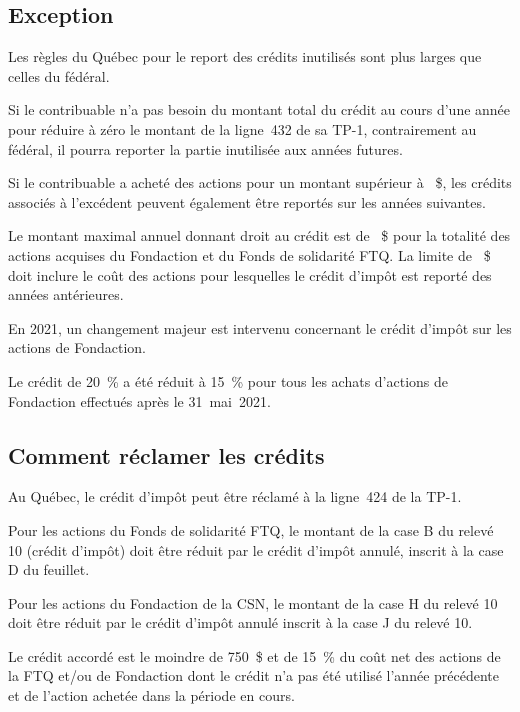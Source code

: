 \subsection{Exception}
Les règles du Québec pour le report des crédits inutilisés sont plus larges que celles du fédéral.

Si le contribuable n'a pas besoin du montant total du crédit au cours d'une année pour réduire à zéro le montant de la ligne~432 de sa TP-1, contrairement au fédéral, il pourra reporter la partie inutilisée aux années futures.

Si le contribuable a acheté des actions pour un montant supérieur à ~\$, les crédits associés à l'excédent peuvent également être reportés sur les années suivantes.

Le montant maximal annuel donnant droit au crédit est de ~\$ pour la totalité des actions acquises du Fondaction et du Fonds de solidarité FTQ. La limite de ~\$ doit inclure le coût des actions pour lesquelles le crédit d'impôt est reporté des années antérieures.

\begin{rappel}
	En 2021, un changement majeur est intervenu concernant le crédit d'impôt sur les actions de Fondaction. 
	
	Le crédit de 20~\% a été réduit à 15~\% pour tous les achats d'actions de Fondaction effectués après le 31~mai~2021.
\end{rappel}


\subsection{Comment réclamer les crédits}
Au Québec, le crédit d'impôt peut être réclamé à la ligne~424 de la TP-1.

Pour les actions du Fonds de solidarité FTQ, le montant de la case B du relevé 10 (crédit d'impôt) doit être réduit par le crédit d'impôt annulé, inscrit à la case D du feuillet. 

Pour les actions du Fondaction de la CSN, le montant de la case H du relevé 10 doit être réduit par le crédit d'impôt annulé inscrit à la case J du relevé 10. 

Le crédit accordé est le moindre de 750~\$ et de 15~\% du coût net des actions de la FTQ et/ou de Fondaction dont le crédit n'a pas été utilisé l'année précédente et de l'action achetée dans la période en cours. 


